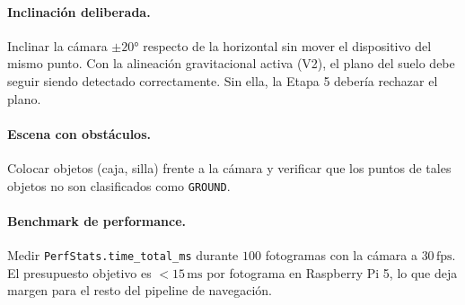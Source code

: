 \paragraph{Inclinación deliberada.}
Inclinar la cámara $\pm 20°$ respecto de la horizontal sin mover el
dispositivo del mismo punto. Con la alineación gravitacional activa (V2),
el plano del suelo debe seguir siendo detectado correctamente. Sin ella,
la Etapa 5 debería rechazar el plano.

\paragraph{Escena con obstáculos.}
Colocar objetos (caja, silla) frente a la cámara y verificar que los puntos
de tales objetos no son clasificados como \texttt{GROUND}.

\paragraph{Benchmark de performance.}
Medir \texttt{PerfStats.time\_total\_ms} durante $100$ fotogramas con la
cámara a $30\,\text{fps}$. El presupuesto objetivo es $< 15\,\text{ms}$ por
fotograma en Raspberry Pi 5, lo que deja margen para el resto del pipeline
de navegación.
